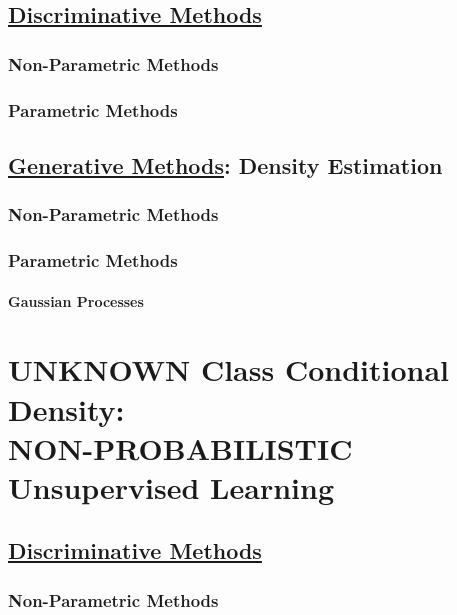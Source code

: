 \documentclass{book}
\begin{document}
\chapter{\underline{Discriminative Methods}}
\section{Non-Parametric Methods}

\section{Parametric Methods}
\chapter{\underline{Generative Methods}: Density Estimation}
\section{Non-Parametric Methods}

\section{Parametric Methods}
\subsection{Gaussian Processes}

\part{UNKNOWN Class Conditional Density:\\NON-PROBABILISTIC Unsupervised Learning}

\chapter{\underline{Discriminative Methods}}
\section{Non-Parametric Methods}
\end{document}
